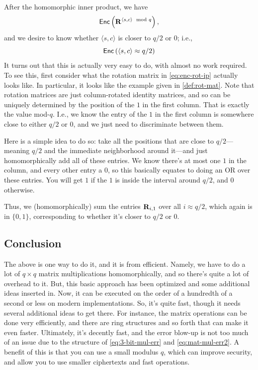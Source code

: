 \documentclass[11pt]{article}
\begin{document}

After the homomorphic inner product, we have
\begin{equation}
    \label{eq:enc-rot-ip}
    \mathsf{Enc}\left( \mathbf{R}^{\langle s, c\rangle \mod q}\right),
\end{equation}
and we desire to know whether $\langle s, c\rangle$ is closer to $q/2$ or 0; i.e.,
$$\mathsf{Enc}\left(\langle s, c\rangle \approx q/2\right)$$
\noindent It turns out that this is actually very easy to do, with almost no work required. To see this, first consider what the rotation matrix in \cref{eq:enc-rot-ip} actually looks like. In particular, it looks like the example given in \cref{def:rot-mat}. Note that rotation matrices are just column-rotated identity matrices, and so can be uniquely determined by the position of the $1$ in the first column. That is exactly the value mod-$q$. I.e., we know the entry of the $1$ in the first column is somewhere close to either $q/2$ or $0$, and we just need to discriminate between them.

Here is a simple idea to do so: take all the positions that are close to $q/2$---meaning $q/2$ and the immediate neighborhood around it---and just homomorphically add all of these entries. We know there's at most one $1$ in the column, and every other entry a $0$, so this basically equates to doing an OR over these entries. You will get $1$ if the $1$ is inside the interval around $q/2$, and $0$ otherwise.

Thus, we (homomorphically) sum the entries $\mathbf{R}_{i,1}$ over all $i \approx q/2$, which again is in $\{0,1\}$, corresponding to whether it's closer to $q/2$ or $0$.


\subsection{Conclusion}
The above is one way to do it, and it is from efficient. Namely, we have to do a lot of $q \times q$ matrix multiplications homomorphically, and so there's quite a lot of overhead to it. But, this basic approach has been optimized and some additional ideas inserted in. Now, it can be executed on the order of a hundredth of a second or less on modern implementations. So, it's quite fast, though it needs several additional ideas to get there. For instance, the matrix operations can be done very efficiently, and there are ring structures and so forth that can make it even faster. Ultimately, it's decently fast, and the error blow-up is not too much of an issue due to the structure of \cref{eq:3-bit-mul-err} and \cref{eq:mat-mul-err2}. A benefit of this is that you can use a small modulus $q$, which can improve security, and allow you to use smaller ciphertexts and fast operations.
\end{document}
